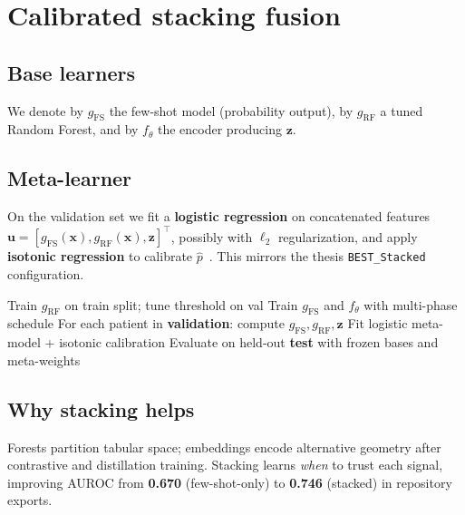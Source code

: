 \section{Calibrated stacking fusion}
\label{sec:stack}

\subsection{Base learners}
We denote by $g_{\mathrm{FS}}$ the few-shot model (probability output), by $g_{\mathrm{RF}}$ a tuned Random Forest, and by $f_\theta$ the encoder producing $\mathbf{z}$.

\subsection{Meta-learner}
On the validation set we fit a \textbf{logistic regression} on concatenated features $\mathbf{u} = [g_{\mathrm{FS}}(\mathbf{x}), g_{\mathrm{RF}}(\mathbf{x}), \mathbf{z}]^\top$, possibly with $\ell_2$ regularization, and apply \textbf{isotonic regression} to calibrate $\hat{p}$~\citep{wolpert1992stacked}. This mirrors the thesis \texttt{BEST\_Stacked} configuration.

\begin{algorithm}[htbp]
\caption{Train stacked feasibility predictor (conceptual)}
\label{alg:stack}
\begin{algorithmic}[1]
\State Train $g_{\mathrm{RF}}$ on train split; tune threshold on val
\State Train $g_{\mathrm{FS}}$ and $f_\theta$ with multi-phase schedule
\State For each patient in \textbf{validation}: compute $g_{\mathrm{FS}}, g_{\mathrm{RF}}, \mathbf{z}$
\State Fit logistic meta-model + isotonic calibration
\State Evaluate on held-out \textbf{test} with frozen bases and meta-weights
\end{algorithmic}
\end{algorithm}

\subsection{Why stacking helps}
Forests partition tabular space; embeddings encode alternative geometry after contrastive and distillation training. Stacking learns \emph{when} to trust each signal, improving AUROC from \textbf{0.670} (few-shot-only) to \textbf{0.746} (stacked) in repository exports.
